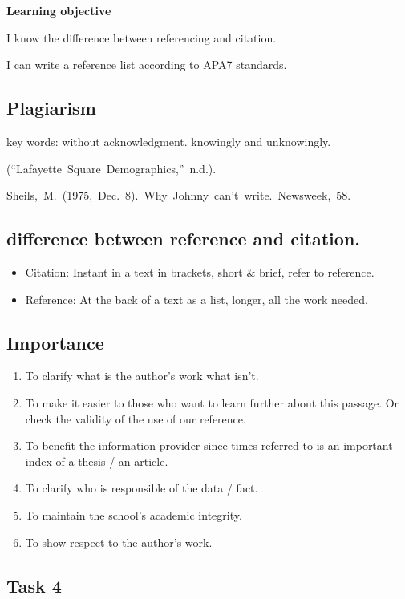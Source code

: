 \documentclass[a4paper]{article}
\begin{document}
\textbf{Learning objective}

I know the difference between referencing and citation.

I can write a reference list according to APA7 standards.

\subsection{Plagiarism}

key words: without acknowledgment. knowingly and unknowingly.

\hbox{(“Lafayette Square Demographics,” n.d.). }

\hbox{Sheils, M. (1975, Dec. 8). Why Johnny can't write. Newsweek, 58.}

\subsection{difference between reference and citation.}

\begin{itemize}
    \item Citation: Instant in a text in brackets, short \& brief, refer to reference.
    \item Reference: At the back of a text as a list, longer, all the work needed.
\end{itemize}

\subsection{Importance}

\begin{enumerate}
    \item To clarify what is the author's work what isn't.
    \item To make it easier to those who want to learn further about this passage. Or check the validity of the use of our reference.
    \item To benefit the information provider since times referred to is an important index of a thesis / an article.
    \item To clarify who is responsible of the data / fact.
    \item To maintain the school's academic integrity.
    \item To show respect to the author's work.
\end{enumerate}

\subsection{Task 4}
\end{document}
